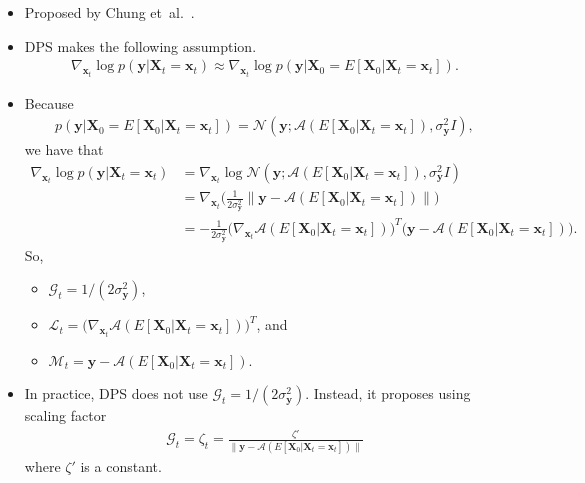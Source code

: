 \documentclass[10pt]{article}
\newcommand{\ve}[1]{\mathbf{#1}}
\newcommand{\etal}{{et~al.}}
\newcommand{\mcal}[1]{\mathcal{#1}}
\begin{document}
\begin{itemize}
  \item Proposed by Chung \etal~\cite{Chung:DPS:2024}.
  
  \item DPS makes the following assumption.
  \begin{align*}
    \nabla_{\ve{x}_t} \log p(\ve{y}|\ve{X}_t = \ve{x}_t) \approx \nabla_{\ve{x}_t} \log p(\ve{y}|\ve{X}_0 = E[\ve{X}_0|\ve{X}_t = \ve{x}_t]).
  \end{align*}

  \item Because
  \begin{align*}
    p(\ve{y}|\ve{X}_0 = E[\ve{X}_0|\ve{X}_t = \ve{x}_t]) = \mcal{N}(\ve{y}; \mcal{A}(E[\ve{X}_0|\ve{X}_t = \ve{x}_t]), \sigma_{\ve{y}}^2 I),
  \end{align*}
  we have that
  \begin{align*}
    \nabla_{\ve{x}_t} \log p(\ve{y}|\ve{X}_t = \ve{x}_t) 
    &= \nabla_{\ve{x}_t} \log \mcal{N}(\ve{y}; \mcal{A}(E[\ve{X}_0|\ve{X}_t = \ve{x}_t]), \sigma_{\ve{y}}^2 I) \\
    &= \nabla_{\ve{x}_t} \bigg( \frac{1}{2 \sigma_{\ve{y}}^2} \| \ve{y} - \mcal{A}(E[\ve{X}_0|\ve{X}_t = \ve{x}_t]) \|  \bigg) \\
    &= - \frac{1}{2\sigma_{\ve{y}}^2} \big( \nabla_{\ve{x}_t} \mcal{A}(E[\ve{X}_0|\ve{X}_t = \ve{x}_t]) \big)^T \big(  \ve{y} - \mcal{A}(E[\ve{X}_0|\ve{X}_t = \ve{x}_t])\big).
  \end{align*}
  So,
  \begin{itemize}
    \item $\mcal{G}_t = 1/(2\sigma^2_{\ve{y}})$,
    \item $\mcal{L}_t = \big( \nabla_{\ve{x}_t} \mcal{A}(E[\ve{X}_0|\ve{X}_t = \ve{x}_t]) \big)^T$, and
    \item $\mcal{M}_t = \ve{y} - \mcal{A}(E[\ve{X}_0|\ve{X}_t = \ve{x}_t])$.
  \end{itemize}

  \item In practice, DPS does not use $\mcal{G}_t = 1/(2\sigma^2_{\ve{y}})$. Instead, it proposes using scaling factor
  \begin{align*}
    \mcal{G}_t = \zeta_t = \frac{\zeta'}{\| \ve{y} - \mcal{A}(E[\ve{X}_0|\ve{X}_t = \ve{x}_t]) \|}
  \end{align*}
  where $\zeta'$ is a constant.
\end{itemize}


  
\end{document}
